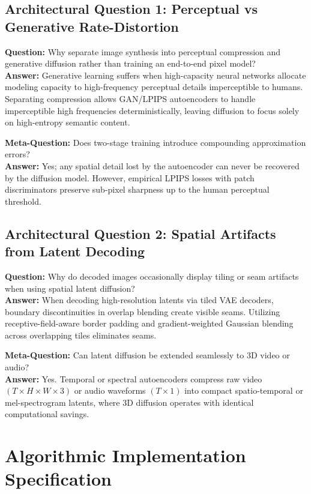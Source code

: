 \documentclass[11pt,a4paper]{article}
\theoremstyle{definition}
\begin{document}
\subsection{Architectural Question 1: Perceptual vs Generative Rate-Distortion}
\textbf{Question:} Why separate image synthesis into perceptual compression and generative diffusion rather than training an end-to-end pixel model?\\
\textbf{Answer:} Generative learning suffers when high-capacity neural networks allocate modeling capacity to high-frequency perceptual details imperceptible to humans. Separating compression allows GAN/LPIPS autoencoders to handle imperceptible high frequencies deterministically, leaving diffusion to focus solely on high-entropy semantic content.

\textbf{Meta-Question:} Does two-stage training introduce compounding approximation errors?\\
\textbf{Answer:} Yes; any spatial detail lost by the autoencoder can never be recovered by the diffusion model. However, empirical LPIPS losses with patch discriminators preserve sub-pixel sharpness up to the human perceptual threshold.

\subsection{Architectural Question 2: Spatial Artifacts from Latent Decoding}
\textbf{Question:} Why do decoded images occasionally display tiling or seam artifacts when using spatial latent diffusion?\\
\textbf{Answer:} When decoding high-resolution latents via tiled VAE decoders, boundary discontinuities in overlap blending create visible seams. Utilizing receptive-field-aware border padding and gradient-weighted Gaussian blending across overlapping tiles eliminates seams.

\textbf{Meta-Question:} Can latent diffusion be extended seamlessly to 3D video or audio?\\
\textbf{Answer:} Yes. Temporal or spectral autoencoders compress raw video $(T \times H \times W \times 3)$ or audio waveforms $(T \times 1)$ into compact spatio-temporal or mel-spectrogram latents, where 3D diffusion operates with identical computational savings.

\section{Algorithmic Implementation Specification}
\end{document}
